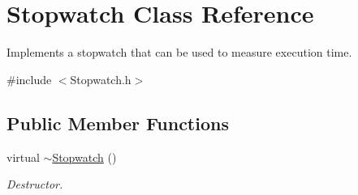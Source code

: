 \hypertarget{classStopwatch}{\section{Stopwatch Class Reference}
\label{classStopwatch}
}


Implements a stopwatch that can be used to measure execution time.  




{\ttfamily \#include $<$Stopwatch.\-h$>$}

\subsection*{Public Member Functions}
\begin{DoxyCompactItemize}
\item 
virtual \hyperlink{classStopwatch_a534c433482f8fe8144c91c0fe37aac20}{$\sim$\-Stopwatch} ()
\begin{DoxyCompactList}\small\item\em Destructor. \end{DoxyCompactList}\end{DoxyCompactItemize}
